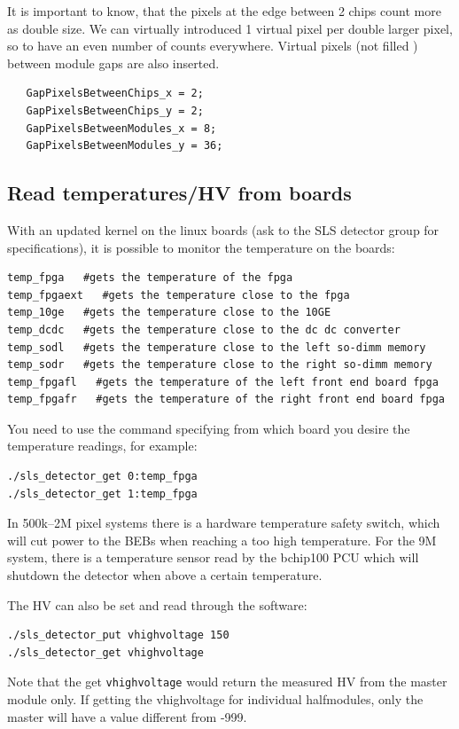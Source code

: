 \documentclass{article}
\begin{document}
It is important to know, that the pixels at the edge between 2 chips count more as double size. We can virtually introduced 1 virtual pixel per double larger pixel, so to have an even number of counts everywhere. Virtual pixels (not filled ) between module gaps are also inserted.

 \begin{verbatim}
   GapPixelsBetweenChips_x = 2;
   GapPixelsBetweenChips_y = 2;
   GapPixelsBetweenModules_x = 8;
   GapPixelsBetweenModules_y = 36;
 \end{verbatim}

\subsection{Read temperatures/HV from boards}

With an updated kernel on the linux boards (ask to the SLS detector group for specifications), it is possible to monitor the temperature on the boards: 
\begin{verbatim}
temp_fpga   #gets the temperature of the fpga
temp_fpgaext   #gets the temperature close to the fpga
temp_10ge   #gets the temperature close to the 10GE
temp_dcdc   #gets the temperature close to the dc dc converter
temp_sodl   #gets the temperature close to the left so-dimm memory
temp_sodr   #gets the temperature close to the right so-dimm memory
temp_fpgafl   #gets the temperature of the left front end board fpga
temp_fpgafr   #gets the temperature of the right front end board fpga

\end{verbatim}

You need to use the command specifying from which board you desire the temperature readings, for example:
\begin{verbatim}
./sls_detector_get 0:temp_fpga
./sls_detector_get 1:temp_fpga
\end{verbatim}
In 500k--2M pixel systems there is a hardware temperature safety switch, which will cut power to the BEBs when reaching a too high temperature. For the 9M system, there is a temperature sensor read by the bchip100 PCU which will shutdown the detector when above a certain temperature.
 
The HV can also be set and read through the software:
\begin{verbatim}
./sls_detector_put vhighvoltage 150
./sls_detector_get vhighvoltage 
\end{verbatim}
Note that the get {\tt{vhighvoltage}} would return the measured HV from the master module only. If getting the vhighvoltage for individual halfmodules, only the master will have a value different from -999.
\end{document}

